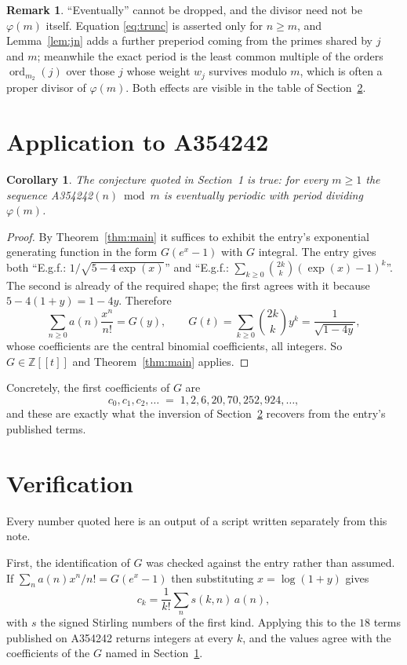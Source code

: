 \documentclass[11pt,a4paper]{article}
\theoremstyle{plain}
\newtheorem{corollary}[theorem]{Corollary}
\theoremstyle{definition}
\newtheorem{remark}[theorem]{Remark}
\newcommand{\ord}{\operatorname{ord}}
\newcommand{\Z}{\mathbb{Z}}
\begin{document}
\begin{remark}
``Eventually'' cannot be dropped, and the divisor need not be $\varphi(m)$ itself.
Equation \eqref{eq:trunc} is asserted only for $n\ge m$, and Lemma~\ref{lem:jn} adds a
further preperiod coming from the primes shared by $j$ and $m$; meanwhile the exact period
is the least common multiple of the orders $\ord_{m_{2}}(j)$ over those $j$ whose weight
$w_{j}$ survives modulo $m$, which is often a proper divisor of $\varphi(m)$. Both effects
are visible in the table of Section~\ref{sec:ver}.
\end{remark}

\section{Application to A354242}\label{sec:apply}

\begin{corollary}\label{cor:this}
The conjecture quoted in Section~1 is true: for every $m\ge1$ the sequence
A354242$(n) \bmod m$ is eventually periodic with period dividing $\varphi(m)$.
\end{corollary}

\begin{proof}
By Theorem~\ref{thm:main} it suffices to exhibit the entry's exponential generating
function in the form $G(e^{x}-1)$ with $G$ integral. The entry gives both ``E.g.f.: $1/\sqrt{5-4\exp(x)}$'' and ``E.g.f.: $\sum_{k\ge0}\binom{2k}{k}(\exp(x)-1)^{k}$''. The second is already of the required shape; the first agrees with it because $5-4(1+y)=1-4y$. Therefore
\[
\sum_{n\ge0}a(n)\frac{x^{n}}{n!}=G(y),\qquad G(t)=\sum_{k\ge0}\binom{2k}{k}y^{k}=\frac{1}{\sqrt{1-4y}} ,
\]
whose coefficients are the central binomial coefficients, all integers. So $G\in\Z[[t]]$ and
Theorem~\ref{thm:main} applies.
\end{proof}

Concretely, the first coefficients of $G$ are
\[
c_{0},c_{1},c_{2},\dots \;=\; 1, 2, 6, 20, 70, 252, 924, \dots ,
\]
and these are exactly what the inversion of Section~\ref{sec:ver} recovers from the
entry's published terms.

\section{Verification}\label{sec:ver}

Every number quoted here is an output of a script written separately from this note.

First, the identification of $G$ was checked against the entry rather than assumed. If
$\sum_{n}a(n)x^{n}/n!=G(e^{x}-1)$ then substituting $x=\log(1+y)$ gives
\[
c_{k}=\frac{1}{k!}\sum_{n}s(k,n)\,a(n),
\]
with $s$ the signed Stirling numbers of the first kind. Applying this to the
$18$ terms published on A354242 returns integers at every $k$, and the values
agree with the coefficients of the $G$ named in Section~\ref{sec:apply}.
\end{document}
